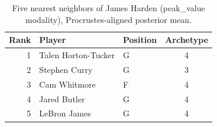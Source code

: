 \begin{table}[htbp]
  \centering\small
  \begin{tabular}{rllc}
    \toprule
    Rank & Player & Position & Archetype \\
    \midrule
    1 & Talen Horton-Tucker & G & 4 \\
    2 & Stephen Curry & G & 3 \\
    3 & Cam Whitmore & F & 4 \\
    4 & Jared Butler & G & 4 \\
    5 & LeBron James & G & 4 \\
    \bottomrule
  \end{tabular}
  \caption{Five nearest neighbors of James Harden (peak_value modality), Procrustes-aligned posterior mean.}
  \label{tab:James_Harden_neighbors_peak_value}
\end{table}

